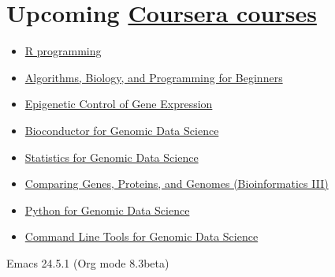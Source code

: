 \documentclass[11pt]{article}
\begin{document}
\section{Upcoming \href{https://www.coursera.org/}{Coursera courses}}
\label{sec-5}
\begin{itemize}
\item \href{https://www.coursera.org/course/rprog}{R programming}
\end{itemize}


\begin{itemize}
\item \href{https://www.coursera.org/course/algobioprogramming}{Algorithms, Biology, and Programming for Beginners}
\end{itemize}


\begin{itemize}
\item \href{https://www.coursera.org/course/epigenetics}{Epigenetic Control of Gene Expression}
\end{itemize}


\begin{itemize}
\item \href{https://www.coursera.org/course/genbioconductor}{Bioconductor for Genomic Data Science}
\end{itemize}


\begin{itemize}
\item \href{https://www.coursera.org/course/genstats}{Statistics for Genomic Data Science}
\end{itemize}


\begin{itemize}
\item \href{https://www.coursera.org/course/comparinggenomes}{Comparing Genes, Proteins, and Genomes (Bioinformatics III)}
\end{itemize}


\begin{itemize}
\item \href{https://www.coursera.org/course/genpython}{Python for Genomic Data Science}
\end{itemize}


\begin{itemize}
\item \href{https://www.coursera.org/course/gencommand}{Command Line Tools for Genomic Data Science}
\end{itemize}
Emacs 24.5.1 (Org mode 8.3beta)
\end{document}
